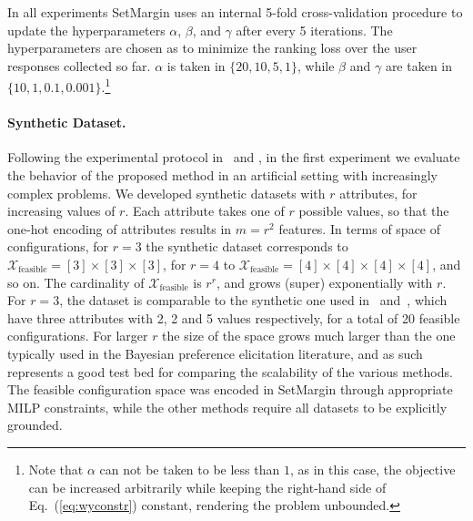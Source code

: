 \documentclass{article}
\renewcommand\[{\begin{equation}}
\renewcommand\]{\end{equation}}
\newcommand{\calvar}[1]{\ensuremath{\mathcal{#1}}}
\newcommand{\calX}{\calvar{X}}
\begin{document}
In all experiments {\sc SetMargin} uses an internal 5-fold cross-validation procedure to
update the hyperparameters $\alpha$, $\beta$, and $\gamma$ after every 5
iterations. The hyperparameters are chosen as to minimize the ranking loss over
the user responses collected so far. $\alpha$ is taken in $\{20, 10, 5, 1\}$,
while $\beta$ and $\gamma$ are taken in $\{10, 1, 0.1, 0.001\}$.\footnote{Note
that $\alpha$ can not be taken to be less than $1$, as in this case, the
objective can be increased arbitrarily while keeping the right-hand side of
Eq.~(\ref{eq:wyconstr}) constant, rendering the problem unbounded.}

\paragraph{Synthetic Dataset.} Following the experimental protocol
in~\cite{guo2010real} and \cite{viappiani2010optimal}, in the first
experiment we evaluate the behavior of the proposed method in an
artificial setting with increasingly complex problems. We developed
synthetic datasets with $r$ attributes, for increasing values of $r$.
Each attribute takes one of $r$ possible values, so that the one-hot
encoding of attributes results in $m=r^2$ features. In terms of space
of configurations, for $r=3$ the synthetic dataset corresponds to 
$\calX_\text{feasible} = [3] \times [3] \times [3]$, for $r=4$ to
$\calX_\text{feasible} = [4] \times [4] \times [4] \times [4]$, and so on. The
cardinality of $\calX_\text{feasible}$ is $r^r$, and grows (super)
exponentially with $r$.
For $r=3$, the dataset is comparable to the synthetic one used
in~\cite{guo2010real} and~\cite{viappiani2010optimal}, which have
three attributes with 2, 2 and 5 values respectively, for a total of
20 feasible configurations.  For larger $r$ the size of the space
grows much larger than the one typically used in the Bayesian
preference elicitation literature, and as such represents a good test
bed for comparing the scalability of the various methods. The feasible
configuration space was encoded in {\sc SetMargin} through appropriate
MILP constraints, while the other methods require all datasets to be
explicitly grounded.
\end{document}
